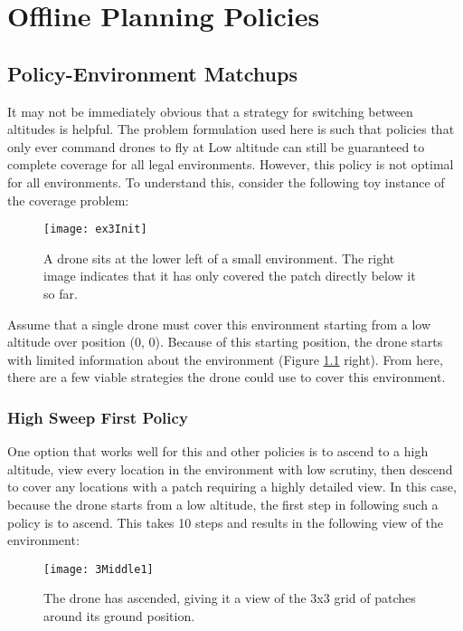 \chapter{Offline Planning Policies}

\section{Policy-Environment Matchups}

It may not be immediately obvious that a strategy for switching between altitudes is helpful. The problem formulation used here is such that policies that only ever command drones to fly at Low altitude can still be guaranteed to complete coverage for all legal environments. However, this policy is not optimal for all environments. To understand this, consider the following toy instance of the coverage problem:

\begin{figure}[H]
\texttt{[image: ex3Init]}
\caption[Tiny Square Environment]{A drone sits at the lower left of a small environment. The right image indicates that it has only covered the patch directly below it so far.}
\label{fig:ex3-1-start}
\end{figure}

Assume that a single drone must cover this environment starting from a low altitude over position (0, 0). Because of this starting position, the drone starts with limited information about the environment (Figure \ref{fig:ex3-1-start} right). From here, there are a few viable strategies the drone could use to cover this environment.

\subsection{High Sweep First Policy}

One option that works well for this and other policies is to ascend to a high altitude, view every location in the environment with low scrutiny, then descend to cover any locations with a patch requiring a highly detailed view. In this case, because the drone starts from a low altitude, the first step in following such a policy is to ascend. This takes 10 steps and results in the following view of the environment:

\begin{figure}[H]
\texttt{[image: 3Middle1]}
\caption[Partially Explored Environment]{The drone has ascended, giving it a view of the 3x3 grid of patches around its ground position.}
\end{figure}

